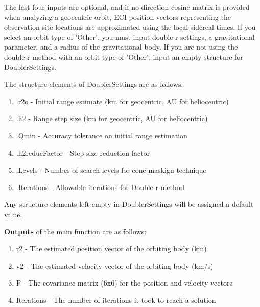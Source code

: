 \documentclass{article}
\begin{document}
			 \par The last four inputs are optional, and if no direction cosine matrix is 
			provided when analyzing a geocentric orbit, ECI position vectors representing the observation site locations are approximated using the local sidereal times. If you select an orbit type of 'Other', you must input double-r settings, a gravitational parameter, and a radius of the gravitational body. If you 
			are not using the double-r method with an orbit type of 'Other', input an empty structure for DoublerSettings.\newline \newline

			The structure elements of DoublerSettings are as follows:
			\begin{enumerate}
			\item .r2o - Initial range estimate (km for geocentric, AU for heliocentric)
			\item .h2 - Range step size (km for geocentric, AU for heliocentric)
			\item .Qmin - Accuracy tolerance on initial range estimation
			\item .h2reducFactor - Step size reduction factor
			\item .Levels - Number of search levels for cone-maskign technique
			\item .Iterations - Allowable iterations for Double-r method
			\newline
			\end{enumerate}

			\par Any structure elements left empty in DoublerSettings will be assigned a default value. \newline\newline

			\textbf{Outputs} of the main function are as follows:
			\begin{enumerate} 
			\item r2 - The estimated position vector of the orbiting body (km)
			\item v2 - The estimated velocity vector of the orbiting body (km/s)
			\item P - The covariance matrix (6x6) for the position and velocity vectors
			\item Iterations - The number of iterations it took to reach a solution 
			\newline
			\end{enumerate}
\end{document}
